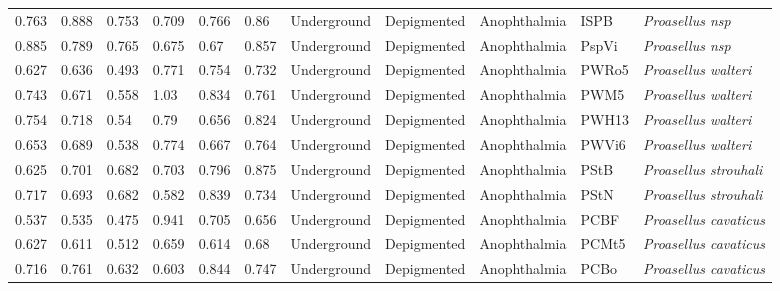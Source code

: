 \begin{tabular}{lllllllllll}
          0.763 &           0.888 &           0.753 &           0.709 &           0.766 &            0.86 &  Underground &  Depigmented &     Anophthalmia &     ISPB &                  \textit{Proasellus nsp} \\
          0.885 &           0.789 &           0.765 &           0.675 &            0.67 &           0.857 &  Underground &  Depigmented &     Anophthalmia &    PspVi &                  \textit{Proasellus nsp} \\
          0.627 &           0.636 &           0.493 &           0.771 &           0.754 &           0.732 &  Underground &  Depigmented &     Anophthalmia &    PWRo5 &              \textit{Proasellus walteri} \\
          0.743 &           0.671 &           0.558 &            1.03 &           0.834 &           0.761 &  Underground &  Depigmented &     Anophthalmia &     PWM5 &              \textit{Proasellus walteri} \\
          0.754 &           0.718 &            0.54 &            0.79 &           0.656 &           0.824 &  Underground &  Depigmented &     Anophthalmia &    PWH13 &              \textit{Proasellus walteri} \\
          0.653 &           0.689 &           0.538 &           0.774 &           0.667 &           0.764 &  Underground &  Depigmented &     Anophthalmia &    PWVi6 &              \textit{Proasellus walteri} \\
          0.625 &           0.701 &           0.682 &           0.703 &           0.796 &           0.875 &  Underground &  Depigmented &     Anophthalmia &     PStB &            \textit{Proasellus strouhali} \\
          0.717 &           0.693 &           0.682 &           0.582 &           0.839 &           0.734 &  Underground &  Depigmented &     Anophthalmia &     PStN &            \textit{Proasellus strouhali} \\
          0.537 &           0.535 &           0.475 &           0.941 &           0.705 &           0.656 &  Underground &  Depigmented &     Anophthalmia &     PCBF &            \textit{Proasellus cavaticus} \\
          0.627 &           0.611 &           0.512 &           0.659 &           0.614 &            0.68 &  Underground &  Depigmented &     Anophthalmia &    PCMt5 &            \textit{Proasellus cavaticus} \\
          0.716 &           0.761 &           0.632 &           0.603 &           0.844 &           0.747 &  Underground &  Depigmented &     Anophthalmia &     PCBo &            \textit{Proasellus cavaticus} \\

\end{tabular}
